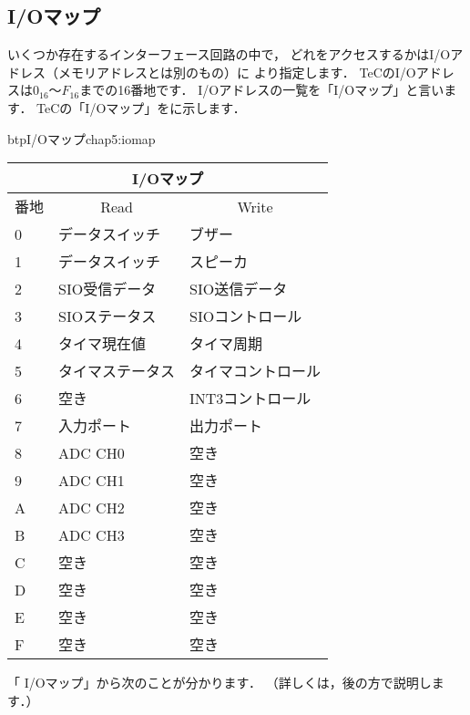 \subsection{I/Oマップ}
\label{iomap}

いくつか存在するインターフェース回路の中で，
どれをアクセスするかはI/Oアドレス（メモリアドレスとは別のもの）に
より指定します．
TeCのI/Oアドレスは$0_{16}$〜$F_{16}$までの16番地です．
I/Oアドレスの一覧を「I/Oマップ」と言います．
TeCの「I/Oマップ」をに示します．

\begin{mytable}{btp}{I/Oマップ}{chap5:iomap}
\small\begin{tabular}{| l | l | l |}
\hline
\multicolumn{3}{|c|}{I/Oマップ} \\
\hline
番地 & \multicolumn{1}{|c|}{Read} & \multicolumn{1}{|c|}{Write} \\
\hline
0 & データスイッチ   & ブザー \\
1 & データスイッチ   & スピーカ \\
2 & SIO受信データ    & SIO送信データ \\
3 & SIOステータス    & SIOコントロール \\
4 & タイマ現在値     & タイマ周期 \\
5 & タイマステータス & タイマコントロール \\
6 & 空き             & INT3コントロール \\
7 & 入力ポート       & 出力ポート \\
8 & ADC CH0          & 空き \\
9 & ADC CH1          & 空き \\
A & ADC CH2          & 空き \\
B & ADC CH3          & 空き \\
C & 空き             & 空き \\
D & 空き             & 空き \\
E & 空き             & 空き \\
F & 空き             & 空き \\
\hline
\end{tabular}
\end{mytable}

「 I/Oマップ」から次のことが分かります．
（詳しくは，後の方で説明します．）

